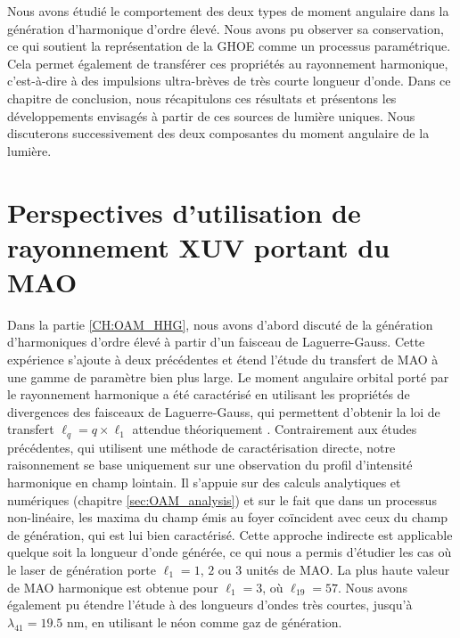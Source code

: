 \renewcommand{\thesection}{\Roman{section}}
\setcounter{section}{0}
\renewcommand{\theHsection}{CL.\the\value{section}}
\renewcommand{\thefigure}{\Roman{section}.\arabic{figure}}
\setcounter{figure}{0}

\makeatletter
\def\toclevel@chapter{-1}
\def\toclevel@section{0}
\def\toclevel@subsection{1}
\makeatother

Nous avons étudié le comportement des deux types de moment angulaire dans la génération d'harmonique d'ordre élevé. Nous avons pu observer sa conservation, ce qui soutient la représentation de la GHOE comme un processus paramétrique. Cela permet également de transférer ces propriétés au rayonnement harmonique, c'est-à-dire à des impulsions ultra-brèves de très courte longueur d'onde. Dans ce chapitre de conclusion, nous récapitulons ces résultats et présentons les développements envisagés à partir de ces sources de lumière uniques. Nous discuterons successivement des deux composantes du moment angulaire de la lumière.

\section{Perspectives d'utilisation de rayonnement XUV portant du MAO}
Dans la partie \ref{CH:OAM_HHG}, nous avons d'abord discuté de la génération d'harmoniques d'ordre élevé à partir d'un faisceau de Laguerre-Gauss. Cette expérience s'ajoute à deux précédentes  et étend l'étude du transfert de MAO à une gamme de paramètre bien plus large. Le moment angulaire orbital porté par le rayonnement harmonique a été caractérisé en utilisant les propriétés de divergences des faisceaux de Laguerre-Gauss, qui permettent d'obtenir la loi de transfert $\ell_q=q\times\ell_1$ attendue théoriquement . Contrairement aux études précédentes, qui utilisent une méthode de caractérisation directe, notre raisonnement se base uniquement sur une observation du profil d'intensité harmonique en champ lointain. Il s'appuie sur des calculs analytiques et numériques (chapitre \ref{sec:OAM_analysis}) et sur le fait que dans un processus non-linéaire, les maxima du champ émis au foyer coïncident avec ceux du champ de génération, qui est lui bien caractérisé. Cette approche indirecte est applicable quelque soit la longueur d'onde générée, ce qui nous a permis d'étudier les cas où le laser de génération porte $\ell_1=1$, $2$ ou $3$ unités de MAO. La plus haute valeur de MAO harmonique est obtenue pour $\ell_1=3$, où $\ell_{19} = 57$. Nous avons également pu étendre l'étude à des longueurs d'ondes très courtes, jusqu'à $\lambda_{41} = 19.5$ nm, en utilisant le néon comme gaz de génération.

